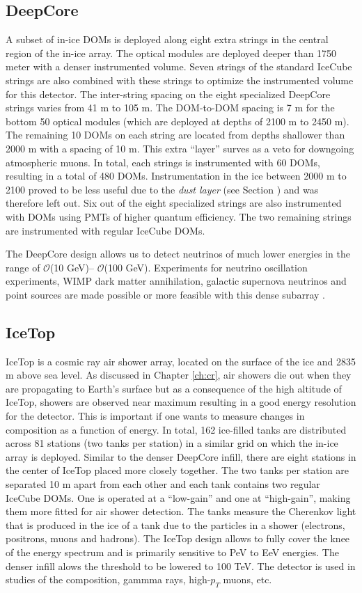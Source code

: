 \subsection{DeepCore}
A subset of in-ice DOMs is deployed along eight extra strings in the central region of the in-ice array. The optical modules are deployed deeper than 1750 meter with a denser instrumented volume. Seven strings of the standard IceCube strings are also combined with these strings to optimize the instrumented volume for this detector. The inter-string spacing on the eight specialized DeepCore strings varies from 41 m to 105 m. The DOM-to-DOM spacing is 7 m for the bottom 50 optical modules (which are deployed at depths of 2100 m to 2450 m). The remaining 10 DOMs on each string are located from depths shallower than 2000 m with a spacing of 10 m. This extra ``layer'' surves as a veto for downgoing atmospheric muons. In total, each strings is instrumented with 60 DOMs, resulting in a total of 480 DOMs. Instrumentation in the ice between 2000 m to 2100 proved to be less useful due to the \textit{dust layer} (see Section \cite{sec:ice}) and was therefore left out. Six out of the eight specialized strings are also instrumented with DOMs using PMTs of higher quantum efficiency. The two remaining strings are instrumented with regular IceCube DOMs.

The DeepCore design allows us to detect neutrinos of much lower energies in the range of $\mathcal{O}$(10 GeV)– $\mathcal{O}$(100 GeV). Experiments for neutrino oscillation experiments, WIMP dark matter annihilation, galactic supernova neutrinos and point sources are made possible or more feasible with this dense subarray \cite{Collaboration:2011ym}.

\subsection{IceTop}
IceTop is a cosmic ray air shower array, located on the surface of the ice and 2835 m above sea level. As discussed in Chapter \ref{ch:cr}, air showers die out when they are propagating to Earth's surface but as a consequence of the high altitude of IceTop, showers are observed near maximum resulting in a good energy resolution for the detector. This is important if one wants to measure changes in composition as a function of energy. In total, 162 ice-filled tanks are distributed across 81 stations (two tanks per station) in a similar grid on which the in-ice array is deployed. Similar to the denser DeepCore infill, there are eight stations in the center of IceTop placed more closely together. The two tanks per station are separated 10 m apart from each other and each tank contains two regular IceCube DOMs. One is operated at a ``low-gain'' and one at ``high-gain'', making them more fitted for air shower detection. The tanks measure the Cherenkov light that is produced in the ice of a tank due to the particles in a shower (electrons, positrons, muons and hadrons). The IceTop design allows to fully cover the knee of the energy spectrum and is primarily sensitive to PeV to EeV energies. The denser infill alows the threshold to be lowered to 100 TeV. The detector is used in studies of the composition, gammma rays, high-$p_T$ muons, etc. 

